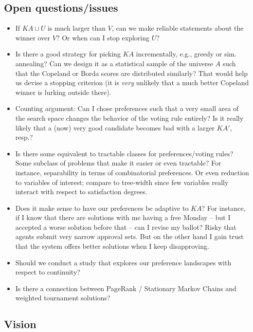 \documentclass[10pt,a4paper,fleqn]{article}
\begin{document}
\subsection{Open questions/issues}

\begin{itemize}

\item If $\mathit{KA} \cup U$ is much larger than $V$, can we make reliable statements about the winner over $V$?
Or when can I stop exploring $U$?
\item Is there a good strategy for picking $\mathit{KA}$ incrementally, e.g., greedy or sim. annealing? Can we design 
it as a statistical sample of the universe $A$ such that the Copeland or Borda scores are distributed similarly? That 
would help us devise a stopping criterion (it is \emph{very} unlikely that a much better Copeland winner is lurking outside there).
\item Counting argument: Can I chose preferences such that a very small area of the search space changes the behavior
of the voting rule entirely? Is it really likely that a (now) very good candidate becomes bad with a larger $\mathit{KA}'$, resp.?
\item Is there some equivalent to tractable classes for preferences/voting rules? Some subclass of problems that make it easier or even 
tractable? For instance, separability in terms of combinatorial preferences. Or even reduction to variables of interest; compare to tree-width since
few variables really interact with respect to satisfaction degrees.
\item Does it make sense to have our preferences be adaptive to $\mathit{KA}$? For instance, if I know that there are solutions
with me having a free Monday -- but I accepted a worse solution before that -- can I revise my ballot? Risky that agents 
submit very narrow approval sets. But on the other hand I gain trust that the system offers better solutions when I keep disapproving.
\item Should we conduct a study that explores our preference landscapes with respect to continuity?
\item Is there a connection between PageRank / Stationary Markov Chains and weighted tournament solutions?
\end{itemize}

\subsection{Vision}
\end{document}
